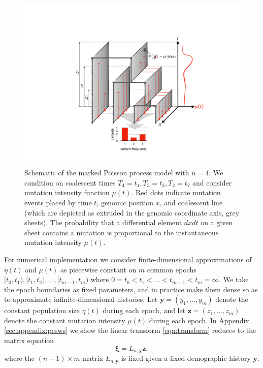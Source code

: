 \documentclass[11pt]{article}
\begin{document}
\begin{figure}
\centering
\includegraphics[width=\textwidth]{figures/model}
\caption{Schematic of the marked Poisson process model with $n=4$.
We condition on coalescent times $T_4=t_4,T_3=t_3,T_2=t_2$ and consider mutation intensity function $\mu(t)$.
Red dots indicate mutation events placed by time $t$, genomic position $x$, and coalescent line (which are depicted as extruded in the genomic coordinate axis, grey sheets).
The probability that a differential element $dxdt$ on a given sheet contains a mutation is proportional to the instantaneous mutation intensity $\mu(t)$.
}
\label{fig:model}
\end{figure}

For numerical implementation we consider finite-dimensional approximations of $\eta(t)$ and $\mu(t)$ as piecewise constant on $m$ common epochs $[t_0, t_1), [t_1, t_2),\dots, [t_{m-1}, t_m)$ where $0=t_0 < t_1 < \dots < t_{m-1} < t_m=\infty$.
We take the epoch boundaries as fixed parameters, and in practice make them dense so as to approximate infinite-dimensional histories.
Let $\boldsymbol y = (y_1,\dots,y_m)$ denote the constant population size $\eta(t)$ during each epoch, and let $\boldsymbol z = (z_1,\dots,z_m)$ denote the constant mutation intensity $\mu(t)$ during each epoch.
In Appendix \ref{sec:appendix:pcsws} we show the linear transform \eqref{eqn:transform} reduces to the matrix equation
\begin{equation}
\label{eqn:transform_discrete}
\boldsymbol \xi = L_{n, \boldsymbol y} \boldsymbol z,
\end{equation}
where the $(n-1)\times m$ matrix $L_{n, \boldsymbol y}$ is fixed given a fixed demographic history $\boldsymbol y$.
\end{document}

